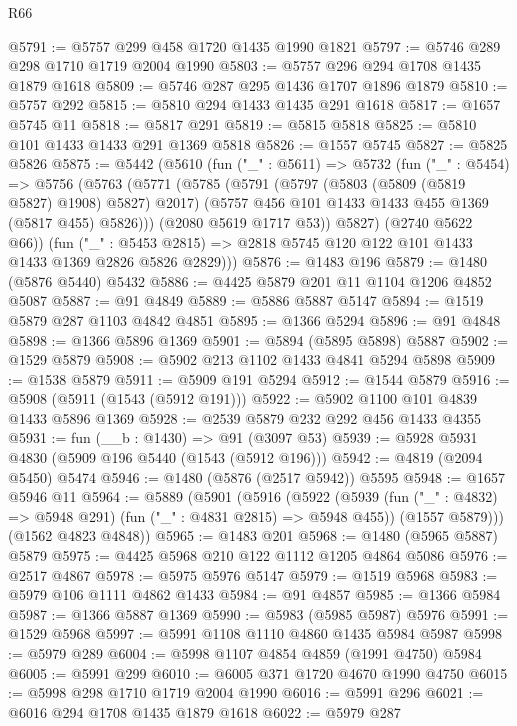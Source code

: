 \begin{lexlean}{R66}
\begin{coremodule}
@5791 := @5757 @299 @458 @1720 @1435 @1990 @1821
@5797 := @5746 @289 @298 @1710 @1719 @2004 @1990
@5803 := @5757 @296 @294 @1708 @1435 @1879 @1618
@5809 := @5746 @287 @295 @1436 @1707 @1896 @1879
@5810 := @5757 @292
@5815 := @5810 @294 @1433 @1435 @291 @1618
@5817 := @1657 @5745 @11
@5818 := @5817 @291
@5819 := @5815 @5818
@5825 := @5810 @101 @1433 @1433 @291 @1369 @5818
@5826 := @1557 @5745
@5827 := @5825 @5826
@5875 := @5442
    (@5610
      (fun ("_" : @5611) =>
      @5732
        (fun ("_" : @5454) =>
        @5756
          (@5763
            (@5771
              (@5785
                (@5791
                  (@5797 (@5803 (@5809 (@5819 @5827) @1908) @5827) @2017)
                  (@5757 @456 @101 @1433 @1433 @455 @1369 (@5817 @455) @5826)))
              (@2080 @5619 @1717 @53))
            @5827)
          (@2740 @5622 @66))
        (fun ("_" : @5453 @2815) =>
        @2818 @5745 @120 @122 @101 @1433 @1433 @1369 @2826 @5826 @2829)))
@5876 := @1483 @196
@5879 := @1480 (@5876 @5440) @5432
@5886 := @4425 @5879 @201 @11 @1104 @1206 @4852 @5087
@5887 := @91 @4849
@5889 := @5886 @5887 @5147
@5894 := @1519 @5879 @287 @1103 @4842 @4851
@5895 := @1366 @5294
@5896 := @91 @4848
@5898 := @1366 @5896 @1369
@5901 := @5894 (@5895 @5898) @5887
@5902 := @1529 @5879
@5908 := @5902 @213 @1102 @1433 @4841 @5294 @5898
@5909 := @1538 @5879
@5911 := @5909 @191 @5294
@5912 := @1544 @5879
@5916 := @5908 (@5911 (@1543 (@5912 @191)))
@5922 := @5902 @1100 @101 @4839 @1433 @5896 @1369
@5928 := @2539 @5879 @232 @292 @456 @1433 @4355
@5931 := fun (__b : @1430) => @91 (@3097 @53)
@5939 := @5928 @5931 @4830 (@5909 @196 @5440 (@1543 (@5912 @196)))
@5942 := @4819 (@2094 @5450) @5474
@5946 := @1480 (@5876 (@2517 @5942)) @5595
@5948 := @1657 @5946 @11
@5964 := @5889
    (@5901
      (@5916
        (@5922
          (@5939 (fun ("_" : @4832) => @5948 @291) (fun ("_" : @4831 @2815) => @5948 @455))
          (@1557 @5879)))
      (@1562 @4823 @4848))
@5965 := @1483 @201
@5968 := @1480 (@5965 @5887) @5879
@5975 := @4425 @5968 @210 @122 @1112 @1205 @4864 @5086
@5976 := @2517 @4867
@5978 := @5975 @5976 @5147
@5979 := @1519 @5968
@5983 := @5979 @106 @1111 @4862 @1433
@5984 := @91 @4857
@5985 := @1366 @5984
@5987 := @1366 @5887 @1369
@5990 := @5983 (@5985 @5987) @5976
@5991 := @1529 @5968
@5997 := @5991 @1108 @1110 @4860 @1435 @5984 @5987
@5998 := @5979 @289
@6004 := @5998 @1107 @4854 @4859 (@1991 @4750) @5984
@6005 := @5991 @299
@6010 := @6005 @371 @1720 @4670 @1990 @4750
@6015 := @5998 @298 @1710 @1719 @2004 @1990
@6016 := @5991 @296
@6021 := @6016 @294 @1708 @1435 @1879 @1618
@6022 := @5979 @287

\end{coremodule}
\end{lexlean}
